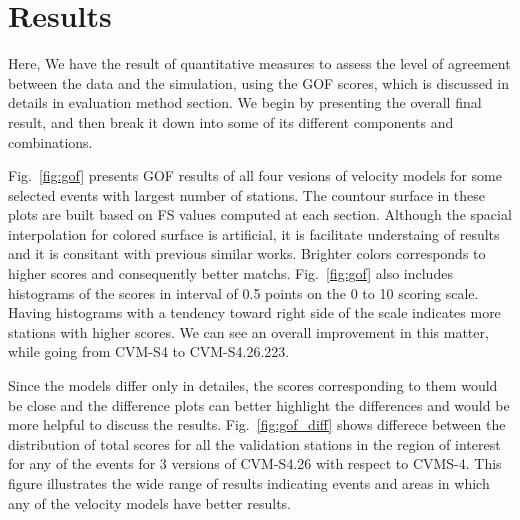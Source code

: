 
\section{Results}

Here, We have the result of quantitative measures to assess the level of agreement between the data and the simulation, using the GOF scores, which is discussed in details in evaluation method section. We begin by presenting the overall final result, and then break it down into some of its different components and combinations. 

Fig.~\ref{fig:gof} presents GOF results of all four vesions of velocity models for some selected events with largest number of stations. The countour surface in these plots are built based on FS values computed at each section. Although the spacial interpolation for colored surface is artificial, it is facilitate understaing of results and it is consitant with previous similar works. Brighter colors corresponds to higher scores and consequently better matchs. Fig.~\ref{fig:gof} also includes histograms of the scores in interval of 0.5 points on the 0 to 10 scoring scale. Having histograms with a tendency toward right side of the scale indicates more stations with higher scores. We can see an overall improvement in this matter, while going from CVM-S4 to CVM-S4.26.223.




Since the models differ only in detailes, the scores corresponding to them would be close and the difference plots can better highlight the differences and would be more helpful to discuss the results. Fig.~\ref{fig:gof_diff} shows differece between the distribution of total scores for all the validation stations in the region of interest for any of the events for 3 versions of CVM-S4.26 with respect to CVMS-4. This figure illustrates the wide range of results indicating events and areas in which any of the velocity models have better results. 


